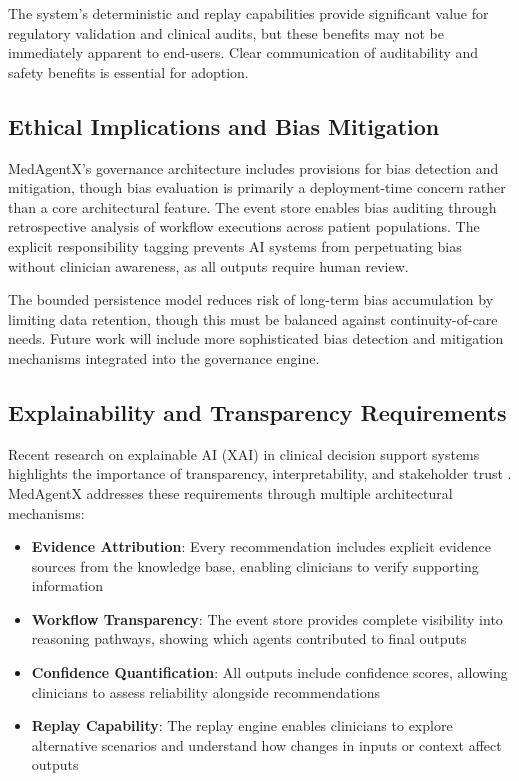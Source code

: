 \documentclass[conference]{IEEEtran}
\begin{document}
The system's deterministic and replay capabilities provide significant value for regulatory validation and clinical audits, but these benefits may not be immediately apparent to end-users. Clear communication of auditability and safety benefits is essential for adoption.

\subsection{Ethical Implications and Bias Mitigation}
MedAgentX's governance architecture includes provisions for bias detection and mitigation, though bias evaluation is primarily a deployment-time concern rather than a core architectural feature. The event store enables bias auditing through retrospective analysis of workflow executions across patient populations. The explicit responsibility tagging prevents AI systems from perpetuating bias without clinician awareness, as all outputs require human review.

The bounded persistence model reduces risk of long-term bias accumulation by limiting data retention, though this must be balanced against continuity-of-care needs. Future work will include more sophisticated bias detection and mitigation mechanisms integrated into the governance engine.

\subsection{Explainability and Transparency Requirements}
Recent research on explainable AI (XAI) in clinical decision support systems highlights the importance of transparency, interpretability, and stakeholder trust \cite{amann2020, xai_cdss_2024, xai_meta_2024}. MedAgentX addresses these requirements through multiple architectural mechanisms:

\begin{itemize}
    \item \textbf{Evidence Attribution}: Every recommendation includes explicit evidence sources from the knowledge base, enabling clinicians to verify supporting information
    \item \textbf{Workflow Transparency}: The event store provides complete visibility into reasoning pathways, showing which agents contributed to final outputs
    \item \textbf{Confidence Quantification}: All outputs include confidence scores, allowing clinicians to assess reliability alongside recommendations
    \item \textbf{Replay Capability}: The replay engine enables clinicians to explore alternative scenarios and understand how changes in inputs or context affect outputs
\end{itemize}
\end{document}
